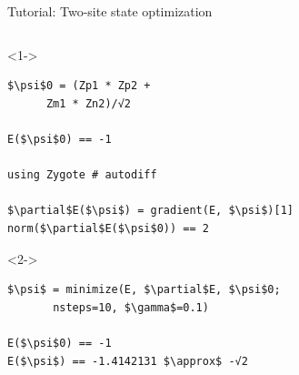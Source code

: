 \begin{frame}[fragile]{Tutorial: Two-site state optimization}

\begin{columns}

\begin{column}{5cm}

\begin{onlyenv}<1->
\begin{lstlisting}[language=JuliaLocal, style=julia, mathescape, basicstyle=\scriptsize\ttfamily]
$\psi$0 = (Zp1 * Zp2 +
      Zm1 * Zn2)/√2

E($\psi$0) == -1

using Zygote # autodiff

$\partial$E($\psi$) = gradient(E, $\psi$)[1]
norm($\partial$E($\psi$0)) == 2
\end{lstlisting}
\end{onlyenv}

\begin{onlyenv}<2->
\begin{lstlisting}[language=JuliaLocal, style=julia, mathescape, basicstyle=\scriptsize\ttfamily]
$\psi$ = minimize(E, $\partial$E, $\psi$0;
       nsteps=10, $\gamma$=0.1)

E($\psi$0) == -1
E($\psi$) == -1.4142131 $\approx$ -√2
 \end{lstlisting}
\end{onlyenv}

\end{column}

\begin{column}{5cm}



\end{column}
\end{columns}
\end{frame}
